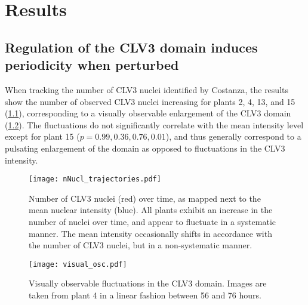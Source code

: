 
\chapter{Results}

\ifpdf
    \graphicspath{{Chapter3/Figs/Raster/}{Chapter3/Figs/PDF/}{Chapter3/Figs/}}
\else
    \graphicspath{{Chapter3/Figs/Vector/}{Chapter3/Figs/}}
\fi

\section{Regulation of the CLV3 domain induces periodicity when perturbed}
When tracking the number of CLV3 nuclei identified by Costanza, the results
show the number of observed CLV3 nuclei
increasing for plants 2, 4, 13, and 15 (\cref{fig:clv3_trajs}), corresponding to a visually observable
enlargement of the CLV3 domain (\cref{fig:visual_osc}). The fluctuations do not significantly correlate with the
mean intensity level except for plant 15 ($p = 0.99, 0.36, 0.76, 0.01$), and
thus generally correspond to a pulsating enlargement of the domain as opposed to
fluctuations in the CLV3 intensity.  

\begin{figure}[H]
  \centering
  \texttt{[image: nNucl\_trajectories.pdf]}
  \caption[Number of CLV3 nuclei over time]{Number of CLV3 nuclei (red)
    over time, as mapped next to the mean nuclear intensity (blue). All plants exhibit
    an increase in the number of nuclei over time, and appear to fluctuate in a
    systematic manner. The mean intensity occasionally shifts in accordance with
    the number of CLV3 nuclei, but in a non-systematic manner.}
  \label{fig:clv3_trajs}
\end{figure}

\begin{figure}[H]
  \centering
  \texttt{[image: visual\_osc.pdf]}
  \caption[Raw image CLV3 domain fluctuations]{Visually observable fluctuations
    in the CLV3 domain. Images are taken from plant 4 in a linear fashion
    between 56 and 76 hours.}
  \label{fig:visual_osc}
\end{figure}

